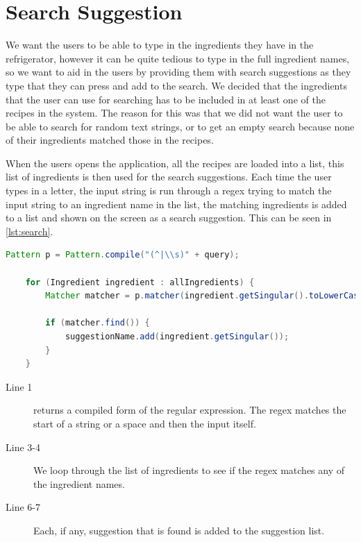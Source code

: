 \section{Search Suggestion}
We want the users to be able to type in the ingredients they have in the refrigerator, however it can be quite tedious to type in the full ingredient names, so we want to aid in the users by providing them with search suggestions as they type that they can press and add to the search. We decided that the ingredients that the user can use for searching has to be included in at least one of the recipes in the system. The reason for this was that we did not want the user to be able to search for random text strings, or to get an empty search because none of their ingredients matched those in the recipes. 

When the users opens the application, all the recipes are loaded into a list, this list of ingredients is then used for the search suggestions. Each time the user types in a letter, the input string is run through a regex trying to match the input string to an ingredient name in the list, the matching ingredients is added to a list and shown on the screen as a search suggestion. This can be seen in \autoref{lst:search}.

\begin{lstlisting}[language=java, label=lst:search, caption={Search suggestions}]
	Pattern p = Pattern.compile("(^|\\s)" + query);

	for (Ingredient ingredient : allIngredients) {
	    Matcher matcher = p.matcher(ingredient.getSingular().toLowerCase());

	    if (matcher.find()) {
	        suggestionName.add(ingredient.getSingular());
	    }
	}
\end{lstlisting}

\begin{description}
\item[Line 1]  returns a compiled form of the regular expression. The regex matches the start of a string or a space and then the input itself. 
\item[Line 3-4] We loop through the list of ingredients to see if the regex matches any of the ingredient names.
\item[Line 6-7] Each, if any, suggestion that is found is added to the suggestion list.
\end{description}

